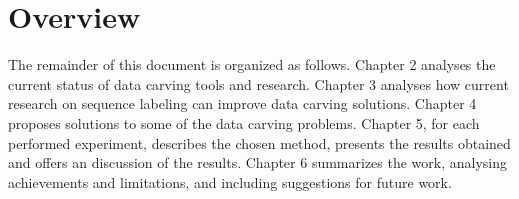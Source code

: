 \section{Overview}

The remainder of this document is organized as follows.
    Chapter 2 analyses the current status of data carving tools and research. 
    Chapter 3 analyses how current research on sequence labeling can improve data carving solutions.
    Chapter 4 proposes solutions to some of the data carving problems.
    Chapter 5, for each performed experiment, describes the chosen method, presents the results obtained and offers an discussion of the results.
    Chapter 6 summarizes the work, analysing achievements and limitations, and including suggestions for future work.
